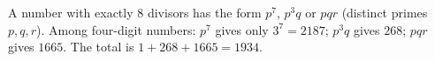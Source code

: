 A number with exactly $8$ divisors has the form $p^7$, $p^3q$ or $pqr$ (distinct primes $p,q,r$). Among four-digit numbers: $p^7$ gives only $3^7=2187$; $p^3q$ gives $268$; $pqr$ gives $1665$. The total is $1+268+1665=\boxed{1934}$.
